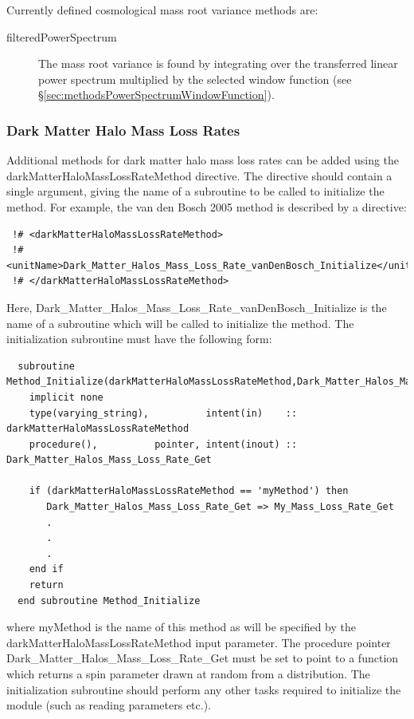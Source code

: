 Currently defined cosmological mass root variance methods are:
\begin{description}
 \item [{\normalfont \ttfamily filteredPowerSpectrum}] The mass root variance is found by integrating over the transferred linear power spectrum multiplied by the selected window function (see \S\ref{sec:methodsPowerSpectrumWindowFunction}).
\end{description}

\subsubsection{Dark Matter Halo Mass Loss Rates}\label{sec:HaloMassLossRates}

Additional methods for dark matter halo mass loss rates can be added using the {\normalfont \ttfamily darkMatterHaloMassLossRateMethod} directive. The directive should contain a single argument, giving the name of a subroutine to be called to initialize the method. For example, the {\normalfont \ttfamily van den Bosch 2005} method is described by a directive:
\begin{verbatim}
 !# <darkMatterHaloMassLossRateMethod>
 !#  <unitName>Dark_Matter_Halos_Mass_Loss_Rate_vanDenBosch_Initialize</unitName>
 !# </darkMatterHaloMassLossRateMethod>
\end{verbatim}
Here, {\normalfont \ttfamily Dark\_Matter\_Halos\_Mass\_Loss\_Rate\_vanDenBosch\_Initialize} is the name of a subroutine which will be called to initialize the method. The initialization subroutine must have the following form:
\begin{verbatim}
  subroutine Method_Initialize(darkMatterHaloMassLossRateMethod,Dark_Matter_Halos_Mass_Loss_Rate_Get)
    implicit none
    type(varying_string),          intent(in)    :: darkMatterHaloMassLossRateMethod
    procedure(),          pointer, intent(inout) :: Dark_Matter_Halos_Mass_Loss_Rate_Get
    
    if (darkMatterHaloMassLossRateMethod == 'myMethod') then
       Dark_Matter_Halos_Mass_Loss_Rate_Get => My_Mass_Loss_Rate_Get
       .
       .
       .
    end if
    return
  end subroutine Method_Initialize
\end{verbatim}
where {\normalfont \ttfamily myMethod} is the name of this method as will be specified by the {\normalfont \ttfamily darkMatterHaloMassLossRateMethod} input parameter. The procedure pointer {\normalfont \ttfamily Dark\_Matter\_Halos\_Mass\_Loss\_Rate\_Get} must be set to point to a function which returns a spin parameter drawn at random from a distribution. The initialization subroutine should perform any other tasks required to initialize the module (such as reading parameters etc.).

